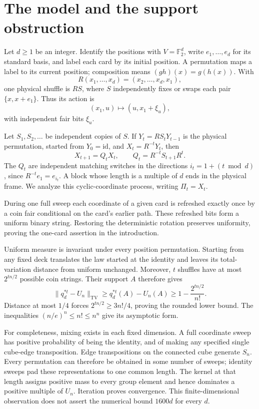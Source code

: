 \documentclass[11pt]{article}
\theoremstyle{remark}
\numberwithin{equation}{section}
\begin{document}
\section{The model and the support obstruction}\label{sec:model}

Let $d\ge1$ be an integer. Identify the positions with \(V=\mathbb F_2^d\), write $e_1,\ldots,e_d$ for its standard basis, and label each card by its initial position. A permutation maps a label to its current position; composition means \((gh)(x)=g(h(x))\). With
\[
 R(x_1,\ldots,x_d)=(x_2,\ldots,x_d,x_1),
\]
one physical shuffle is \(RS\), where \(S\) independently fixes or swaps each pair \(\{x,x+e_1\}\). Thus its action is
\[
 (x_1,u)\longmapsto (u,x_1+\xi_u),
\]
with independent fair bits \(\xi_u\).

Let $S_1,S_2,\ldots$ be independent copies of $S$. If \(Y_t=RS_tY_{t-1}\) is the physical permutation, started from $Y_0=\mathrm{id}$, and \(X_t=R^{-t}Y_t\), then
\[
 X_{t+1}=Q_tX_t,\qquad
 Q_t=R^{-t}S_{t+1}R^t.
\]
The \(Q_t\) are independent matching switches in the directions
\(i_t=1+(t\bmod d)\), since $R^{-t}e_1=e_{i_t}$. A block whose length is a multiple of \(d\) ends in the physical frame. We analyze this cyclic-coordinate process, writing \(\Pi_t=X_t\).

During one full sweep each coordinate of a given card is refreshed
exactly once by a coin fair conditional on the card's earlier path.
These refreshed bits form a uniform binary string. Restoring the
deterministic rotation preserves uniformity, proving the one-card
assertion in the introduction.

Uniform measure is invariant under every position permutation. Starting from any fixed deck translates the law started at the identity and leaves its total-variation distance from uniform unchanged. Moreover, \(t\) shuffles have at most \(2^{tn/2}\) possible coin strings. Their support \(A\) therefore gives
\[
 \|q_d^{*t}-U_n\|_{\mathrm{TV}}
 \ge q_d^{*t}(A)-U_n(A)
 \ge1-\frac{2^{tn/2}}{n!}.
\]
Distance at most \(1/4\) forces \(2^{tn/2}\ge3n!/4\), proving the rounded lower bound. The inequalities \((n/e)^n\le n!\le n^n\) give its asymptotic form.

For completeness, mixing exists in each fixed dimension. A full coordinate sweep has positive probability of being the identity, and of making any specified single cube-edge transposition. Edge transpositions on the connected cube generate \(S_n\). Every permutation can therefore be obtained in some number of sweeps; identity sweeps pad these representations to one common length. The kernel at that length assigns positive mass to every group element and hence dominates a positive multiple of \(U_n\). Iteration proves convergence. This finite-dimensional observation does not assert the numerical bound \(1600d\) for every \(d\).
\end{document}
